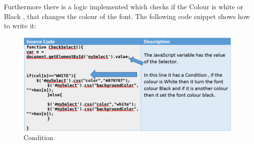 Furthermore there is  a logic implemented which checks if the Colour is white or Black , that changes the colour of the font. The following code snippet shows how to write it:\\
\begin{figure}[htbp]
\centering
\includegraphics[width=0.4\linewidth]{graphics/bgfn.png}
\caption{Condition}
\end{figure}